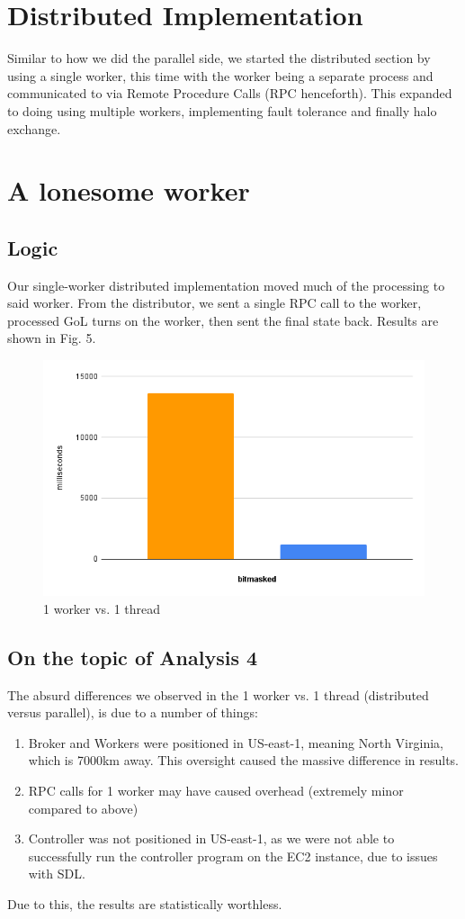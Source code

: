 \documentclass[twoside,twocolumn]{article}
\begin{document}
\section{Distributed Implementation}
Similar to how we did the parallel side, we started the distributed section by using a single worker, this time
with the worker being a separate process and communicated to via Remote Procedure Calls (RPC henceforth). This expanded to
doing using multiple workers, implementing fault tolerance and finally halo exchange.

\section{A lonesome worker}
\subsection{Logic}
Our single-worker distributed implementation moved much of the processing to said worker. From the distributor, we sent a 
single RPC call to the worker, processed GoL turns on the worker, then sent the final state back. Results are shown in Fig. 5.
\begin{figure}
  \includegraphics[width=\linewidth]{1v1.png}
  \caption{1 worker vs. 1 thread}
  \label{fig:chart5}
\end{figure}
\subsection{On the topic of Analysis 4}
The absurd differences we observed in the 1 worker vs. 1 thread (distributed versus parallel), is due 
to a number of things:
\begin{enumerate}
  \item Broker and Workers were positioned in US-east-1, meaning North Virginia, which is 7000km away.
  This oversight caused the massive difference in results.
  \item RPC calls for 1 worker may have caused overhead (extremely minor compared to above)
  \item Controller was not positioned in US-east-1, as we were not able to successfully run the controller
  program on the EC2 instance, due to issues with SDL.
\end{enumerate}
Due to this, the results are statistically worthless.
\end{document}
